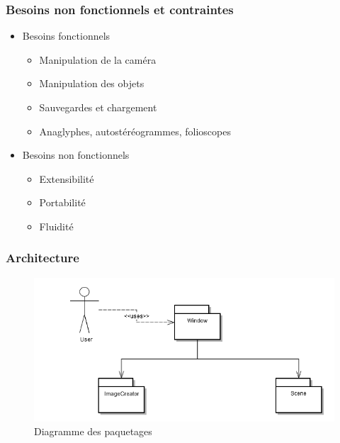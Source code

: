 \documentclass{beamer}
\begin{document}
\begin{frame}
\frametitle{Besoins non fonctionnels et contraintes}
\begin{itemize}[label=$\bullet$]
\item Besoins fonctionnels
	\begin{itemize}[label=$\circ$]
	\item Manipulation de la caméra
	\item Manipulation des objets
	\item Sauvegardes et chargement
	\item Anaglyphes, autostéréogrammes, folioscopes
	\end{itemize}
\item Besoins non fonctionnels
	\begin{itemize}[label=$\circ$]
	\item Extensibilité
	\item Portabilité
	\item Fluidité
	\end{itemize}
\end{itemize}
\end{frame}


\begin{frame}
\frametitle{Architecture}
\centering
\begin{figure}
  \includegraphics[scale=0.4]{paquetages.jpg}
  \caption{Diagramme des paquetages}
\end{figure}
\end{frame}

\end{document}
